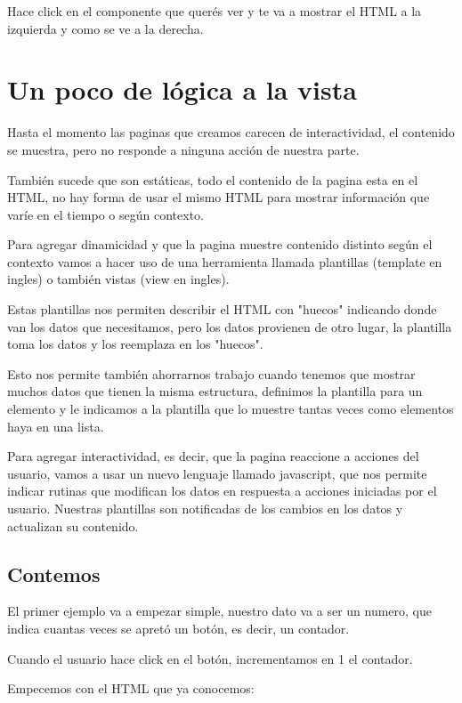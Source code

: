 \documentclass[letterpaper,10pt,spanish]{sphinxmanual}
\begin{document}
Hace click en el componente que querés ver y te va a mostrar el HTML a la
izquierda y como se ve a la derecha.


\chapter{Un poco de lógica a la vista}
\label{\detokenize{un-poco-de-logica-a-la-vista:un-poco-de-logica-a-la-vista}}\label{\detokenize{un-poco-de-logica-a-la-vista::doc}}
Hasta el momento las paginas que creamos carecen de interactividad, el
contenido se muestra, pero no responde a ninguna acción de nuestra parte.

También sucede que son estáticas, todo el contenido de la pagina esta en el
HTML, no hay forma de usar el mismo HTML para mostrar información que varíe en
el tiempo o según contexto.

Para agregar dinamicidad y que la pagina muestre contenido distinto según el
contexto vamos a hacer uso de una herramienta llamada plantillas (template en
ingles) o también vistas (view en ingles).

Estas plantillas nos permiten describir el HTML con "huecos" indicando donde
van los datos que necesitamos, pero los datos provienen de otro lugar, la
plantilla toma los datos y los reemplaza en los "huecos".

Esto nos permite también ahorrarnos trabajo cuando tenemos que mostrar muchos
datos que tienen la misma estructura, definimos la plantilla para un elemento y
le indicamos a la plantilla que lo muestre tantas veces como elementos haya en
una lista.

Para agregar interactividad, es decir, que la pagina reaccione a acciones del
usuario, vamos a usar un nuevo lenguaje llamado javascript, que nos permite
indicar rutinas que modifican los datos en respuesta a acciones iniciadas por
el usuario. Nuestras plantillas son notificadas de los cambios en los datos y
actualizan su contenido.


\section{Contemos}
\label{\detokenize{un-poco-de-logica-a-la-vista:contemos}}
El primer ejemplo va a empezar simple, nuestro dato va a ser un numero, que
indica cuantas veces se apretó un botón, es decir, un contador.

Cuando el usuario hace click en el botón, incrementamos en 1 el contador.

Empecemos con el HTML que ya conocemos:
\end{document}
